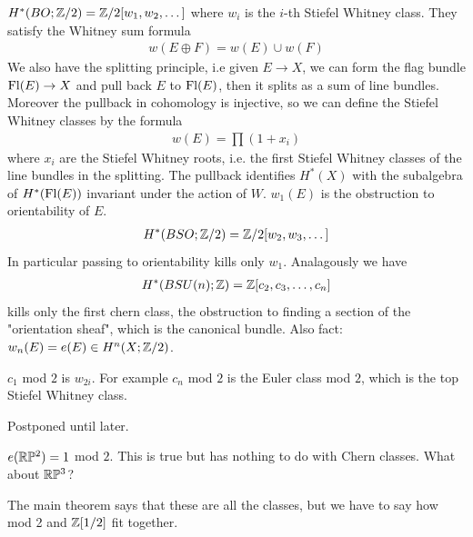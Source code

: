 \documentclass[12pt]{article}
\begin{document}
        \begin{theorem}
            $H^*(BO;\mathbb{Z}/2) = \mathbb{Z}/2[w_1, w_2, \dots]$ where $w_i$ is the $i$-th Stiefel Whitney class. They satisfy the Whitney sum formula \begin{align*}
                w(E\oplus F) = w(E) \cup w(F)
            \end{align*} We also have the splitting principle, i.e given $E \to X$, we can form the flag bundle $\operatorname{Fl}(E) \to X$ and pull back $E$ to $\operatorname{Fl}(E)$, then it splits as a sum of line bundles. Moreover the pullback in cohomology is injective, so we can define the Stiefel Whitney classes by the formula \begin{align*}
                w(E) = \prod (1 + x_i)
            \end{align*} where $x_i$ are the Stiefel Whitney roots, i.e. the first Stiefel Whitney classes of the line bundles in the splitting. The pullback identifies $H^*(X)$ with the subalgebra of $H^*(\operatorname{Fl}(E))$ invariant under the action of $W$.
            $w_1(E)$ is the obstruction to orientability of $E$. \begin{align*}
                H^*(BSO;\mathbb{Z}/2) = \mathbb{Z}/2[w_2, w_3, \dots] 
            \end{align*}
In particular passing to orientability kills only $w_1$. Analagously we have \begin{align*}
    H^*(BSU(n);\mathbb{Z}) = \mathbb{Z}[c_2, c_3, \dots, c_n]
\end{align*} kills only the first chern class, the obstruction to finding a section of the "orientation sheaf", which is the canonical bundle.
Also fact: $w_n(E) = e(E) \in H^n(X;\mathbb{Z}/2)$.
        \end{theorem}

        \begin{proposition}
            $c_1$ mod $2$ is $w_{2i}$. For example $c_n$ mod $2$ is the Euler class mod $2$, which is the top Stiefel Whitney class. 
        \end{proposition}
        Postponed until later.
\begin{example}
    $e(\mathbb{R}\mathbb{P}^2) = 1$ mod $2$. This is true but has nothing to do with Chern classes. What about $\mathbb{R}\mathbb{P}^3$?
\end{example}
The main theorem says that these are all the classes, but we have to say how mod 2 and $\mathbb{Z}[1/2]$ fit together.
\end{document}
